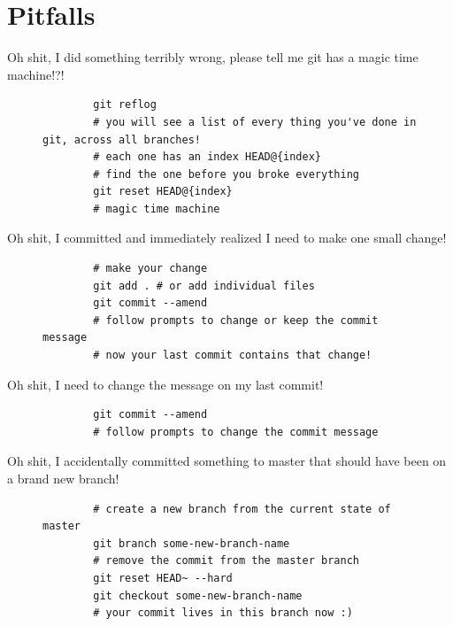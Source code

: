 \section{Pitfalls}

\begin{frame}[fragile]{Oh shit, I did something terribly wrong, please tell me git has a magic time machine!?!}
    \begin{figure}
    \begin{lstlisting}
        git reflog
        # you will see a list of every thing you've done in git, across all branches!
        # each one has an index HEAD@{index}
        # find the one before you broke everything
        git reset HEAD@{index}
        # magic time machine
    \end{lstlisting}
    \end{figure}
\end{frame}

\begin{frame}[fragile]{Oh shit, I committed and immediately realized I need to make one small change!}
    \begin{figure}
    \begin{lstlisting}
        # make your change
        git add . # or add individual files
        git commit --amend
        # follow prompts to change or keep the commit message
        # now your last commit contains that change!
    \end{lstlisting}
    \end{figure}
\end{frame}

\begin{frame}[fragile]{Oh shit, I need to change the message on my last commit!}
    \begin{figure}
    \begin{lstlisting}
        git commit --amend
        # follow prompts to change the commit message
    \end{lstlisting}
    \end{figure}
\end{frame}

\begin{frame}[fragile]{Oh shit, I accidentally committed something to master that should have been on a brand new branch!}
    \begin{figure}
    \begin{lstlisting}
        # create a new branch from the current state of master
        git branch some-new-branch-name
        # remove the commit from the master branch
        git reset HEAD~ --hard
        git checkout some-new-branch-name
        # your commit lives in this branch now :)
    \end{lstlisting}
    \end{figure}
\end{frame}

